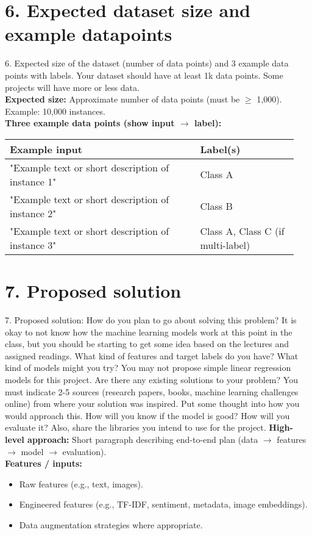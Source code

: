 \documentclass[12pt]{article}
\begin{document}
\section*{6. Expected dataset size and example datapoints}
6. Expected size of the dataset (number of data points) and 3 example data points with labels. Your dataset should have at least 1k data points. 
Some projects will have more or less data.\\ 
\textbf{Expected size:} Approximate number of data points (must be $\ge$ 1,000). Example: 10,000 instances.\\[6pt]
\textbf{Three example data points (show input $\rightarrow$ label):} \\
\begin{tabular}{p{0.62\linewidth} p{0.32\linewidth}}
\toprule
Example input & Label(s) \\
\midrule
"Example text or short description of instance 1" & Class A \\
"Example text or short description of instance 2" & Class B \\
"Example text or short description of instance 3" & Class A, Class C (if multi-label) \\
\bottomrule
\end{tabular}

\section*{7. Proposed solution}
7. Proposed solution: How do you plan to go about solving this problem? It is okay to not know how the machine learning models work at this point in the class,
but you should be starting to get some idea based on the lectures and assigned readings. What kind of features and target labels do you have? What kind of models 
might you try? You may not propose simple linear regression models for this project. Are there any existing solutions to your problem? You must indicate 2-5 sources 
(research papers, books, machine learning challenges online) from where your solution was inspired. Put some thought into how you would approach this. How will you 
know if the model is good? How will you evaluate it? Also, share the libraries you intend to use for the project.  
\textbf{High-level approach:} Short paragraph describing end-to-end plan (data $\rightarrow$ features $\rightarrow$ model $\rightarrow$ evaluation).\\[4pt]

\textbf{Features / inputs:}
\begin{itemize}
  \item Raw features (e.g., text, images).
  \item Engineered features (e.g., TF-IDF, sentiment, metadata, image embeddings).
  \item Data augmentation strategies where appropriate.
\end{itemize}
\end{document}
